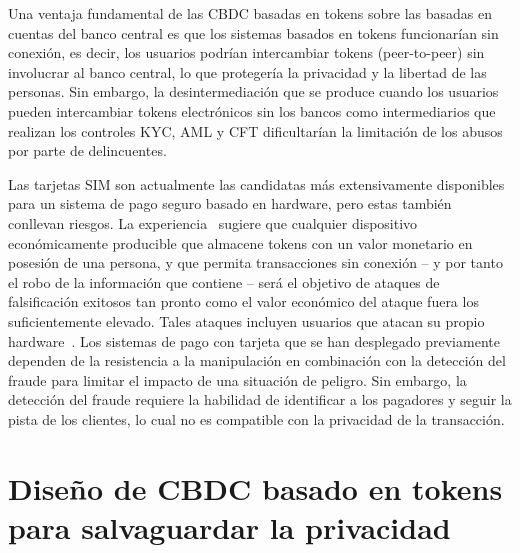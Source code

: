 \documentclass[10pt,spanish]{article}
\begin{document}
Una ventaja fundamental de las CBDC basadas en tokens sobre las basadas
en cuentas del banco central es que los sistemas basados en tokens
funcionarían sin conexión, es decir, los usuarios podrían intercambiar
tokens (peer-to-peer) sin involucrar al banco central, lo que protegería
la privacidad y la libertad de las personas. Sin embargo, la
desintermediación que se produce cuando los usuarios pueden intercambiar
tokens electrónicos sin los bancos como intermediarios que realizan los
controles KYC, AML y CFT dificultarían la limitación de los abusos por
parte de delincuentes.

Las tarjetas SIM son actualmente las candidatas más extensivamente
disponibles para un sistema de pago seguro basado en hardware, pero
estas también conllevan riesgos. La experiencia~\cite[véase p. ej.][]{Soukup,Garcia,Kasper,CCC} sugiere
que cualquier dispositivo económicamente producible que almacene tokens
con un valor monetario en posesión de una persona, y que permita
transacciones sin conexión -- y por tanto el robo de la información que
contiene -- será el objetivo de ataques de falsificación exitosos tan
pronto como el valor económico del ataque fuera los suficientemente
elevado. Tales ataques incluyen usuarios que atacan su propio
hardware~\cite[véase también]{Allen}. Los sistemas de pago con tarjeta que
se han desplegado previamente dependen de la resistencia a la
manipulación en combinación con la detección del fraude para limitar el
impacto de una situación de peligro. Sin embargo, la detección del
fraude requiere la habilidad de identificar a los pagadores y seguir la
pista de los clientes, lo cual no es compatible con la privacidad de la
transacción.

\hypertarget{diseuxf1o-de-cbdc-basado-en-tokens-para-salvaguardar-la-privacidad}{%
\section{Diseño de CBDC basado en tokens para salvaguardar la
privacidad}
\label{4.-diseuxf1o-de-cbdc-basado-en-tokens-para-salvaguardar-la-privacidad}}
\end{document}
